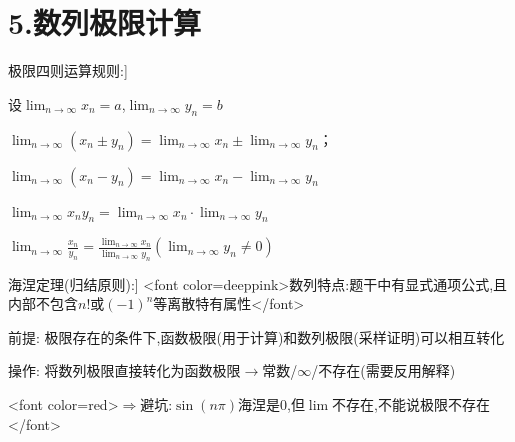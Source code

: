 \documentclass[11pt,a4paper,UTF8]{ctexart}
\begin{document}
\section{5.数列极限计算}

\begin{thmbox}[[1]极限四则运算规则:]

设$\lim_{n \to \infty} x_n = a$,$\lim_{n \to \infty} y_n = b$

$\lim_{n \to \infty}(x_n \pm y_n) = \lim_{n \to \infty} x_n \pm \lim_{n \to \infty} y_n$；

$\lim_{n \to \infty}(x_n - y_n) = \lim_{n \to \infty} x_n - \lim_{n \to \infty} y_n$

$\lim_{n \to \infty} x_n y_n = \lim_{n \to \infty} x_n \cdot \lim_{n \to \infty} y_n$

$\lim_{n \to \infty} \frac{x_n}{y_n} = \frac{\lim_{n \to \infty} x_n}{\lim_{n \to \infty} y_n} (\lim_{n \to \infty} y_n \neq 0)$

\end{thmbox}
\begin{thmbox}[[2]海涅定理(归结原则):]
\textit{}<font color=deeppink>数列特点:题干中有显式通项公式,且内部不包含$n!$或$(-1)^n$等离散特有属性</font>\textit{}

前提: 极限存在的条件下,函数极限(用于计算)和数列极限(采样证明)可以相互转化

操作: 将数列极限直接转化为函数极限$\to$常数/$\infty$/不存在(需要反用解释)

     <font color=red>$\Rightarrow$避坑:$\sin(n\pi)$海涅是$0$,但$\lim$不存在,不能说极限不存在</font>

\end{thmbox}
\end{document}
